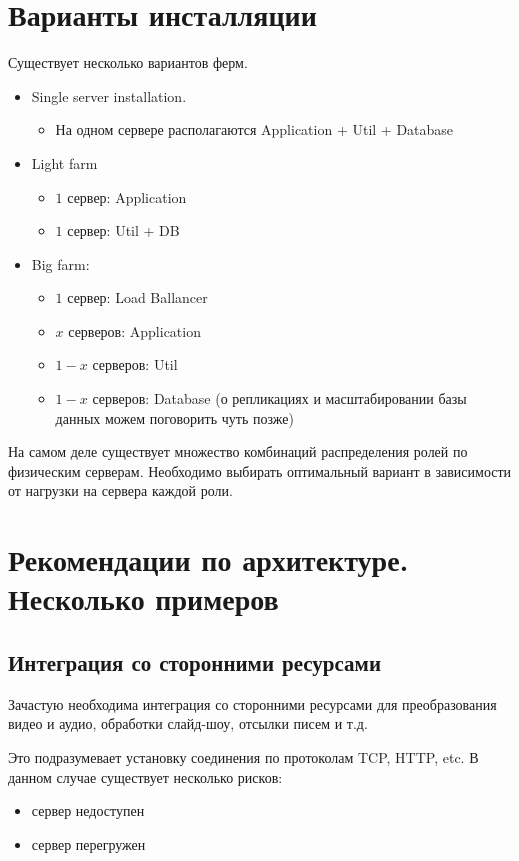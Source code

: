 \documentclass[10pt, a5paper]{article}
\begin{document}
\section*{Варианты инсталляции}
Существует несколько вариантов ферм.
\begin{itemize}
\item Single server installation.
  \begin{itemize}
  \item На одном сервере располагаются Application + Util + Database
  \end{itemize}
\item Light farm
  \begin{itemize}
  \item $1$ сервер: Application 
  \item $1$ сервер: Util + DB
  \end{itemize}
\item Big farm:
  \begin{itemize}
  \item $1$ сервер: Load Ballancer 
  \item $x$ серверов: Application
  \item $1-x$ серверов: Util 
  \item $1-x$ серверов: Database (о репликациях и масштабировании базы данных можем поговорить чуть позже) 
  \end{itemize}
\end{itemize}
На самом деле существует множество комбинаций распределения ролей по физическим серверам. Необходимо выбирать оптимальный вариант в зависимости от нагрузки на сервера каждой роли. 

\section*{Рекомендации по архитектуре. Несколько примеров}

\subsection*{Интеграция со сторонними ресурсами}
Зачастую необходима интеграция со сторонними ресурсами для преобразования видео и аудио, обработки слайд-шоу, отсылки писем и т.д. 

Это подразумевает установку соединения по протоколам TCP, HTTP, etc. 
В данном случае существует несколько рисков:
\begin{itemize}
\item сервер недоступен
\item сервер перегружен 
\end{itemize}
\end{document}
